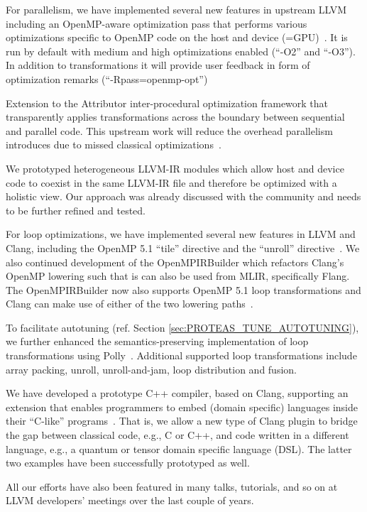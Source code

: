 For parallelism, we have implemented several new features in upstream LLVM
including an OpenMP-aware optimization pass that performs various optimizations
specific to OpenMP code on the host and device (=GPU)~\cite{OpenMPOpt2020}. It
is run by default with medium and high optimizations enabled (``-O2'' and
``-O3''). In addition to transformations it will provide user feedback in form
of optimization remarks (``-Rpass=openmp-opt'')

Extension to the Attributor inter-procedural optimization framework that
transparently applies transformations across the  boundary between sequential
and parallel code. This upstream work will reduce the overhead parallelism
introduces due to missed classical optimizations~\cite{giorgis2020}.

We prototyped heterogeneous LLVM-IR modules which allow host and device code to
coexist in the same LLVM-IR file and therefore be optimized with a holistic
view. Our approach was already discussed with the community and needs to be
further refined and tested.

For loop optimizations, we have implemented several new features in LLVM and
Clang, including the OpenMP 5.1 ``tile'' directive and the ``unroll'' directive~\cite{kruse2021openmpbooth}.
We also continued development of the OpenMPIRBuilder which refactors Clang's OpenMP lowering such that is can also be used from MLIR, specifically Flang.
The OpenMPIRBuilder now also supports OpenMP 5.1 loop transformations and Clang can make use of either of the two lowering paths~\cite{kruse2021clangast}.

To facilitate autotuning (ref. Section \ref{sec:PROTEAS_TUNE_AUTOTUNING}), we further
enhanced the semantics-preserving implementation of loop transformations using Polly~\cite{wu2021autotuning}.
Additional supported loop transformations include array packing, unroll, unroll-and-jam, loop distribution and fusion.

We have developed a prototype C++ compiler, based on Clang, supporting an
extension that enables programmers to embed (domain specific) languages inside
their ``C-like'' programs~\cite{finkel2020dsl}. That is, we allow a new type of
Clang plugin to bridge the gap between classical code, e.g., C or C++, and code
written in a different language, e.g., a quantum or tensor domain specific
language (DSL). The latter two examples have been successfully prototyped as
well.

All our efforts have also been featured in many talks, tutorials, and so on at
LLVM developers' meetings over the last couple of years.

